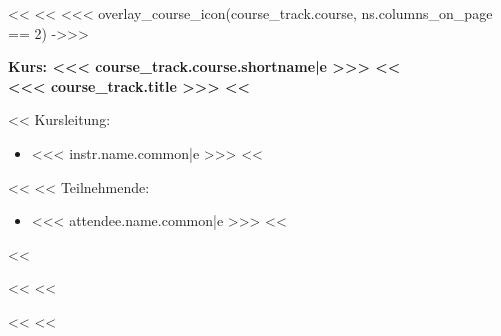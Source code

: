                     \pagebreak
                <<%
                <<%
                <<< overlay_course_icon(course_track.course, ns.columns_on_page == 2) ->>>
                \begin{minipage}[t]{0.5\textwidth}
                    {\headingfamily\bfseries
                        Kurs: <<< course_track.course.shortname|e >>>
                        <<%
                            \\\mdseries
                                <<< course_track.title >>>
                        <<%
                        \vspace{0.6\baselineskip}
                    }

                    <<%
                        Kursleitung:
                        \begin{itemize}
                            <<%
                                \item <<< instr.name.common|e >>>
                            <<%
                        \end{itemize}
                    <<%
                    <<%
                        Teilnehmende:
                        \begin{itemize}
                        <<%
                            \item <<< attendee.name.common|e >>>
                        <<%
                        \end{itemize}
                    <<%
                \end{minipage}%
            <<%
        <<%


        \pagebreak
    <<%
<<%
